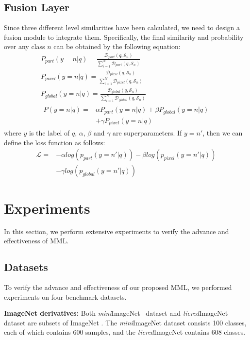 \documentclass{article}
\begin{document}
\subsection{Fusion Layer}
Since three different level similarities have been calculated, we need to design a fusion module to integrate them. Specifically, the final similarity and probability over any class $n$ can be obtained by the following equation: 
\begin{gather}
	P_{part}(y=n|q) =  \frac{\mathcal{D}_{part}(q, \mathcal{S}_n)}{\sum_{i=1}^{N}\mathcal{D}_{part}(q, \mathcal{S}_n)}\\
	P_{pixel}(y=n|q) =\frac{\mathcal{D}_{pixel}(q, \mathcal{S}_n)}{\sum_{i=1}^{N}\mathcal{D}_{pixel}(q, \mathcal{S}_n)}\\
	P_{global}(y=n|q) =\frac{\mathcal{D}_{global}(q, \mathcal{S}_n)}{\sum_{i=1}^{N}\mathcal{D}_{global}(q, \mathcal{S}_n)}\\
	\begin{aligned}
		P(y=n|q) =& \alpha P_{part}(y=n|q) + 	\beta P_{global}(y=n|q)\\&  +\gamma 	P_{pixel}(y=n|q)
	\end{aligned}
\end{gather}
where $y$ is the label of $q$, $\alpha$, $\beta$ and $\gamma$ are superparameters. If $y=n'$, then we can define the loss function as follows:
\begin{equation}
	\begin{aligned}
		\mathcal{L} =& -\alpha log(p_{part}(y=n'|q))-\beta log(p_{pixel}(y=n'|q))\\&-\gamma log(p_{global}(y=n'|q))
	\end{aligned}
\end{equation}

\section{Experiments}
In this section, we perform extensive experiments to verify the advance and effectiveness of MML. 
\subsection{Datasets}
To verify the advance and effectiveness of our proposed MML, we performed experiments on four benchmark datasets.

\textbf{ImageNet derivatives:} Both \emph{mini}ImageNet~\cite{vinyals2016matching} dataset and \emph{tiered}ImageNet~\cite{ren18iclr} dataset are subsets of ImageNet \cite{deng2009imagenet}. The \emph{mini}ImageNet dataset consists 100 classes, each of which contains 600 samples, and the \emph{tiered}ImageNet contains 608 classes.
\end{document}
